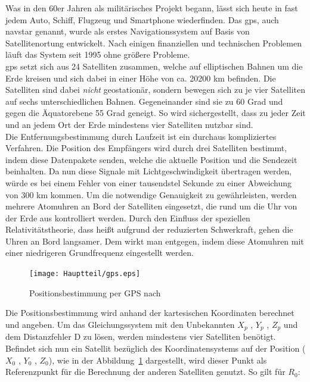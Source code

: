 Was in den 60er Jahren als militärisches Projekt begann, lässt sich heute in fast jedem Auto,
Schiff, Flugzeug und Smartphone wiederfinden. Das \ac{gps}, auch \acs{navstar} genannt, wurde
als erstes Navigationssystem auf Basis von Satellitenortung entwickelt. Nach einigen finanziellen
und technischen Problemen läuft das System seit 1995 ohne größere Probleme.\cite{gpsabel}\\
\ac{gps} setzt sich aus 24 Satelliten zusammen, welche auf elliptischen Bahnen um die Erde kreisen
und sich dabei in einer Höhe von ca. 20200 km befinden. Die Satelliten sind dabei \emph{nicht} geostationär,
sondern bewegen sich zu je vier Satelliten auf sechs unterschiedlichen Bahnen. Gegeneinander sind sie zu 60 Grad
und gegen die Äquatorebene 55 Grad geneigt. So wird sichergestellt, dass zu jeder Zeit und an jedem Ort der
Erde mindestens vier Satelliten nutzbar sind. \cite{gpsabel}\\
Die Entfernungsbestimmung durch Laufzeit ist ein durchaus kompliziertes Verfahren. Die Position des Empfängers
wird durch drei Satelliten bestimmt, indem diese Datenpakete senden, welche die aktuelle Position und die
Sendezeit beinhalten. Da nun diese Signale mit Lichtgeschwindigkeit übertragen werden, würde es bei einem
Fehler von einer tausendstel Sekunde zu einer Abweichung von 300 km kommen. Um die notwendige Genauigkeit zu
gewährleisten, werden mehrere Atomuhren an Bord der Satelliten eingesetzt, die rund um die Uhr von der Erde aus
 kontrolliert werden. Durch den Einfluss der speziellen Relativitätstheorie, dass heißt aufgrund der reduzierten Schwerkraft,
gehen die Uhren an Bord langsamer. Dem wirkt man entgegen, indem diese Atomuhren mit einer
niedrigeren Grundfrequenz eingestellt werden. \cite{gpsabel}\\

\begin{figure}[h!]
\centering
\texttt{[image: Hauptteil/gps.eps]}
\caption{Positionsbestimmung per GPS nach \cite{gpsabel}}
\label{fig:gps}
\end{figure}



Die Positionsbestimmung wird anhand der kartesischen Koordinaten berechnet und angeben.
Um das Gleichungssystem mit den Unbekannten \(X_{p}\) , \(Y_{p}\) , \(Z_{p}\) und dem Distanzfehler D zu lösen, werden
mindestens vier Satelliten benötigt. Befindet sich nun ein Satellit bezüglich des Koordinatensystems
auf der Position (\(X_{0}\) , \(Y_{0}\) , \(Z_{0}\)), wie in der Abbildung~\ref{fig:gps} dargestellt, wird dieser Punkt als Referenzpunkt
für die Berechnung der anderen Satelliten genutzt. So gilt für \(R_{0}\):\\

